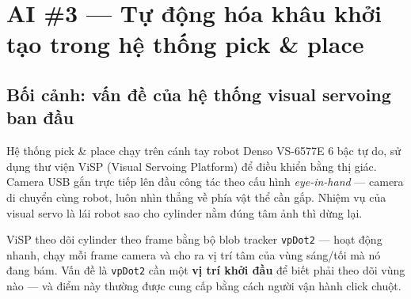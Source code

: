 


\section{AI \#3 --- Tự động hóa khâu khởi tạo trong hệ thống pick \& place}
\label{sec:ai3}

\subsection{Bối cảnh: vấn đề của hệ thống visual servoing ban đầu}
\label{subsec:ai3-context}

Hệ thống pick \& place chạy trên cánh tay robot Denso VS-6577E 6 bậc
tự do, sử dụng thư viện ViSP (Visual Servoing Platform) để điều
khiển bằng thị giác. Camera USB gắn trực tiếp lên đầu công tác
theo cấu hình \textit{eye-in-hand} --- camera di chuyển cùng robot,
luôn nhìn thẳng về phía vật thể cần gắp. Nhiệm vụ của visual servo
là lái robot sao cho cylinder nằm đúng tâm ảnh thì dừng lại.

ViSP theo dõi cylinder theo frame bằng bộ blob tracker \texttt{vpDot2} ---
hoạt động nhanh, chạy mỗi frame camera và cho ra vị trí tâm của vùng
sáng/tối mà nó đang bám. Vấn đề là \texttt{vpDot2} cần một
\textbf{vị trí khởi đầu} để biết phải theo dõi vùng nào --- và điểm
này thường được cung cấp bằng cách người vận hành click chuột.

